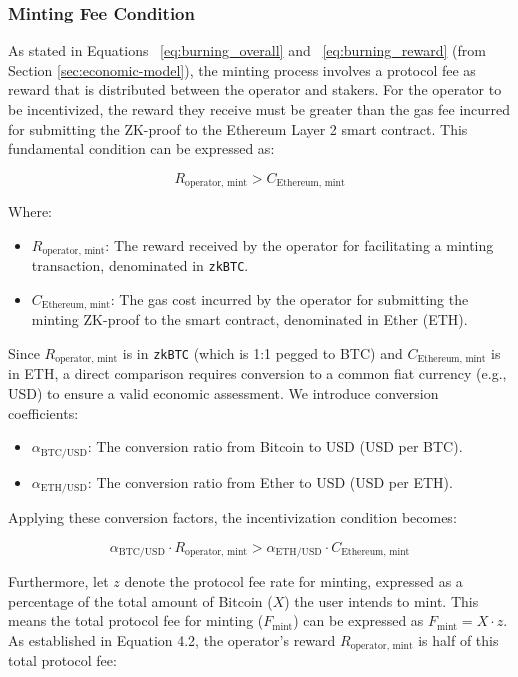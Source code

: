 \documentclass{DESSThesis}
\newcommand{\zktoken}{\texttt{zkBTC}}
\begin{document}
\subsubsection{Minting Fee Condition}
As stated in Equations ~\ref{eq:burning_overall} and ~\ref{eq:burning_reward} (from Section \ref{sec:economic-model}), the minting process involves a protocol fee as reward that is distributed between the operator and stakers. For the operator to be incentivized, the reward they receive must be greater than the gas fee incurred for submitting the ZK-proof to the Ethereum Layer 2 smart contract. This fundamental condition can be expressed as:

\[
R_{\text{operator, mint}} > C_{\text{Ethereum, mint}}
\]

Where:
\begin{itemize}
    \item \(R_{\text{operator, mint}}\): The reward received by the operator for facilitating a minting transaction, denominated in \texttt{\zktoken}.
    \item \(C_{\text{Ethereum, mint}}\): The gas cost incurred by the operator for submitting the minting ZK-proof to the smart contract, denominated in Ether (ETH).
\end{itemize}

Since \(R_{\text{operator, mint}}\) is in \texttt{\zktoken} (which is 1:1 pegged to BTC) and \(C_{\text{Ethereum, mint}}\) is in ETH, a direct comparison requires conversion to a common fiat currency (e.g., USD) to ensure a valid economic assessment. We introduce conversion coefficients:

\begin{itemize}
    \item \(\alpha_{\text{BTC/USD}}\): The conversion ratio from Bitcoin to USD (USD per BTC).
    \item \(\alpha_{\text{ETH/USD}}\): The conversion ratio from Ether to USD (USD per ETH).
\end{itemize}

Applying these conversion factors, the incentivization condition becomes:

\[
\alpha_{\text{BTC/USD}} \cdot R_{\text{operator, mint}} > \alpha_{\text{ETH/USD}} \cdot C_{\text{Ethereum, mint}}
\]

Furthermore, let \(z\) denote the protocol fee rate for minting, expressed as a percentage of the total amount of Bitcoin (\(X\)) the user intends to mint. This means the total protocol fee for minting (\(F_{\text{mint}}\)) can be expressed as \(F_{\text{mint}} = X \cdot z\). As established in Equation 4.2, the operator's reward \(R_{\text{operator, mint}}\) is half of this total protocol fee:
\end{document}
